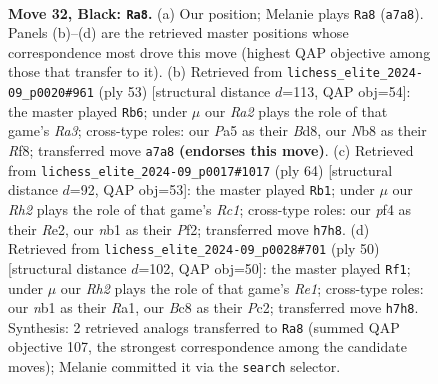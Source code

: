 \documentclass[11pt]{article}
\begin{document}
\clearpage

\begin{figure}[p]\centering
\begin{subfigure}{0.46\textwidth}\centering
\resizebox{\linewidth}{!}{%
\newchessgame
\chessboard[
  setfen={1nb5/rp4kr/2pqp3/p2p1p1p/Pn1P1P1N/6P1/1PPQB1KP/1N2R2R b - - 18 32},
  showmover=false,
  pgfstyle=straightmove, color=movearrow, markmove={a7-a8}
]}
\caption{}
\end{subfigure}\hfill
\begin{subfigure}{0.46\textwidth}\centering
\resizebox{\linewidth}{!}{%
\newchessgame
\chessboard[
  setfen={3b1rnk/1p3pp1/r2p2qp/p1pP4/P1PpNB2/1P5P/4RPP1/3QR2K b - - 15 27},
  showmover=false,
  pgfstyle=straightmove, color=movearrow, markmove={a6-b6}
]}
\caption{}
\end{subfigure}
\\[4pt]
\begin{subfigure}{0.46\textwidth}\centering
\resizebox{\linewidth}{!}{%
\newchessgame
\chessboard[
  setfen={r1r3k1/q4pp1/2pbp2p/2Np4/1PnP4/p1BQP2P/P3RPP1/2R3K1 w - - 4 33},
  showmover=false,
  pgfstyle=straightmove, color=movearrow, markmove={c1-b1}
]}
\caption{}
\end{subfigure}\hfill
\begin{subfigure}{0.46\textwidth}\centering
\resizebox{\linewidth}{!}{%
\newchessgame
\chessboard[
  setfen={1r3rk1/1b1q1p1n/p2pn1p1/N2Np3/1P2P1Pp/3QP2P/2P3B1/R3R1K1 w - - 4 26},
  showmover=false,
  pgfstyle=straightmove, color=movearrow, markmove={e1-f1}
]}
\caption{}
\end{subfigure}
\caption{\textbf{Move 32, Black: \texttt{Ra8}.} (a) Our position; Melanie plays \texttt{Ra8} (\texttt{a7a8}). Panels (b)--(d) are the retrieved master positions whose correspondence most drove this move (highest QAP objective among those that transfer to it). (b) Retrieved from \texttt{lichess\_elite\_2024-09\_p0020\#961} (ply 53) [structural distance $d$=113, QAP obj=54]: the master played \texttt{Rb6}; under $\mu$ our \emph{Ra2} plays the role of that game's \emph{Ra3}; cross-type roles: our \emph{P}a5 as their \emph{B}d8, our \emph{N}b8 as their \emph{R}f8; transferred move \texttt{a7a8} \textbf{(endorses this move)}. (c) Retrieved from \texttt{lichess\_elite\_2024-09\_p0017\#1017} (ply 64) [structural distance $d$=92, QAP obj=53]: the master played \texttt{Rb1}; under $\mu$ our \emph{Rh2} plays the role of that game's \emph{Rc1}; cross-type roles: our \emph{p}f4 as their \emph{R}e2, our \emph{n}b1 as their \emph{P}f2; transferred move \texttt{h7h8}. (d) Retrieved from \texttt{lichess\_elite\_2024-09\_p0028\#701} (ply 50) [structural distance $d$=102, QAP obj=50]: the master played \texttt{Rf1}; under $\mu$ our \emph{Rh2} plays the role of that game's \emph{Re1}; cross-type roles: our \emph{n}b1 as their \emph{R}a1, our \emph{B}c8 as their \emph{P}c2; transferred move \texttt{h7h8}. Synthesis: 2 retrieved analogs transferred to \texttt{Ra8} (summed QAP objective 107, the strongest correspondence among the candidate moves); Melanie committed it via the \texttt{search} selector.}
\label{fig:thought-m63}
\end{figure}
\end{document}
